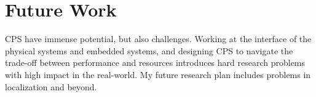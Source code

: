 \documentclass[10pt]{article}
\begin{document}


\section{Future Work}
CPS have immense potential, but also challenges. Working at the interface of the physical systems and embedded systems, and designing CPS to navigate the trade-off between performance and resources introduces hard research problems with high impact in the real-world. My future research plan includes problems in localization and beyond. 
\end{document}
